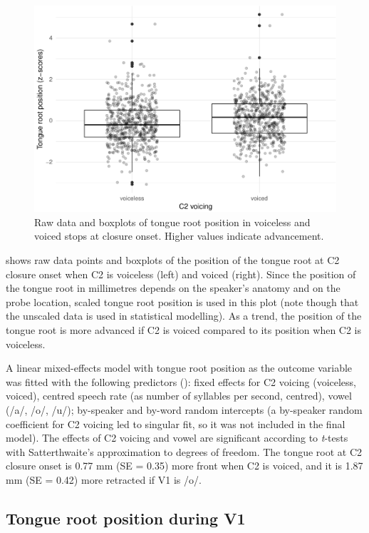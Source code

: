 \documentclass[12pt,]{article}
\begin{document}
\begin{figure}
\includegraphics[width=\linewidth]{2018-tra_files/figure-latex/trp-z-box-1} \caption{Raw data and boxplots of tongue root position in voiceless and voiced stops at closure onset. Higher values indicate advancement.}\label{f:trp-z-box}
\end{figure}

 shows raw data points and boxplots of the position of
the tongue root at C2 closure onset when C2 is voiceless (left) and
voiced (right). Since the position of the tongue root in millimetres
depends on the speaker's anatomy and on the probe location, scaled
tongue root position is used in this plot (note though that the unscaled
data is used in statistical modelling). As a trend, the position of the
tongue root is more advanced if C2 is voiced compared to its position
when C2 is voiceless.

A linear mixed-effects model with tongue root position as the outcome
variable was fitted with the following predictors
(): fixed effects for C2 voicing (voiceless,
voiced), centred speech rate (as number of syllables per second,
centred), vowel (/a/, /o/, /u/); by-speaker and by-word random
intercepts (a by-speaker random coefficient for C2 voicing led to
singular fit, so it was not included in the final model). The effects of
C2 voicing and vowel are significant according to \emph{t}-tests with
Satterthwaite's approximation to degrees of freedom. The tongue root at
C2 closure onset is 0.77 mm (SE = 0.35) more front when C2 is voiced,
and it is 1.87 mm (SE = 0.42) more retracted if V1 is /o/.

\hypertarget{tongue-root-position-during-v1}{%
\subsection{Tongue root position during
V1}\label{tongue-root-position-during-v1}}
\end{document}
